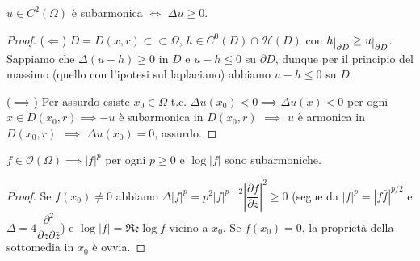 \begin{prop}
  $u \in C^2(\Omega)$ è subarmonica $\iff$ $\Delta u \ge 0$.
\end{prop}

\begin{proof}
  ($\Leftarrow$) $D=D(x,r) \subset\subset \Omega$, $h \in C^0(D)\cap \mathcal{H}(D)$ con $h\restrict{\partial D} \ge u\restrict{\partial D}$. Sappiamo che $\Delta(u-h) \ge 0$ in $D$ e $u-h \le 0$ su $\partial D$, dunque per il principio del massimo (quello con l'ipotesi sul laplaciano) abbiamo $u-h \le 0$ su $D$.

  ($\implies$) Per assurdo esiste $x_0 \in \Omega$ t.c. $\Delta u(x_0)<0 \implies \Delta u(x)<0$ per ogni $x \in D(x_0,r) \implies -u$ è subarmonica in $D(x_0,r)$ $\implies$ $u$ è armonica in $D(x_0,r)$ $\implies$ $\Delta u(x_0)=0$, assurdo.
\end{proof}

\begin{cor}
  $f \in \mathcal{O}(\Omega) \implies |f|^p$ per ogni $p \ge 0$ e $\log{|f|}$ sono subarmoniche.
\end{cor}

\begin{proof}
  Se $f(x_0)\not=0$ abbiamo $\Delta|f|^p=p^2|f|^{p-2}\left|\dfrac{\partial f}{\partial z}\right|^2 \ge 0$ (segue da $|f|^p=|f\bar{f}|^{p/2}$ e $\Delta=4\dfrac{\partial^2}{\partial z\partial\bar{z}}$) e $\log{|f|}=\mathfrak{Re}\log{f}$ vicino a $x_0$.
  Se $f(x_0)=0$, la proprietà della sottomedia in $x_0$ è ovvia.
\end{proof}
